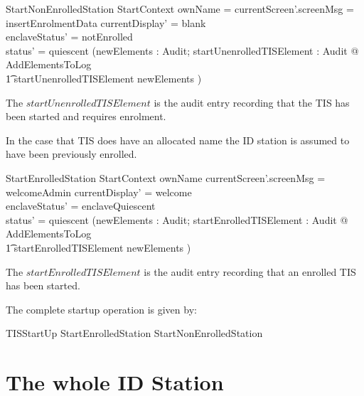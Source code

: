 \begin{schema}{StartNonEnrolledStation}
        StartContext
\where 
        ownName = \Nil
\also
        currentScreen'.screenMsg = insertEnrolmentData
\also
	currentDisplay' = blank
\\	enclaveStatus' = notEnrolled
\\      status' = quiescent
\also
        (\exists newElements : \finset Audit;
        startUnenrolledTISElement : Audit @ AddElementsToLog 
\\ \t1  \land startUnenrolledTISElement \in newElements )
\end{schema}
\begin{Zcomment}
\item
The $startUnenrolledTISElement$ is the audit entry recording that the
TIS has been started and requires enrolment. 
\end{Zcomment}

In the case that TIS does have an allocated name the ID station is
assumed to have been previously enrolled.

\begin{schema}{StartEnrolledStation}
        StartContext
\where 
        ownName \neq \Nil
\also
        currentScreen'.screenMsg = welcomeAdmin
\also
	currentDisplay' = welcome
\\	enclaveStatus' = enclaveQuiescent
\\      status' = quiescent
\also
        (\exists newElements : \finset Audit;
        startEnrolledTISElement : Audit @ AddElementsToLog 
\\ \t1  \land startEnrolledTISElement \in newElements )
\end{schema}
\begin{Zcomment}
\item
The $startEnrolledTISElement$ is the audit entry recording that an enrolled
TIS has been started. 
\end{Zcomment}

The complete startup operation is given by:

\begin{zed}
        TISStartUp  StartEnrolledStation \lor
        StartNonEnrolledStation
\end{zed}








\chapter{The whole ID Station}
\label{sec:Whole}

